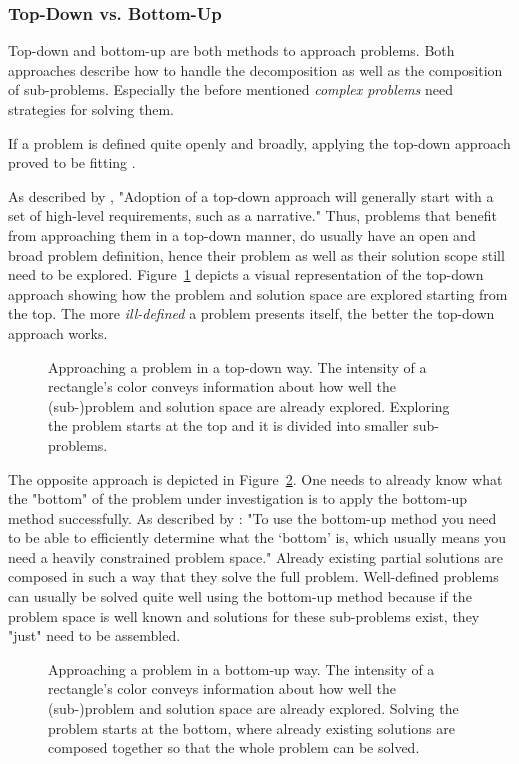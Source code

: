 \subsubsection{Top-Down vs. Bottom-Up}
Top-down and bottom-up are both methods to approach problems.
Both approaches describe how to handle the decomposition as well as the composition of sub-problems.
Especially the before mentioned \emph{complex problems} need strategies for solving them.

If a problem is defined quite openly and broadly, applying the top-down approach proved to be fitting \cite{kung_comparing_2013}.

As described by \citeauthor{kung_comparing_2013} \cite{kung_comparing_2013}, "Adoption of a top-down approach will generally start with a set of high-level requirements, such as a narrative."
Thus, problems that benefit from approaching them in a top-down manner, do usually have an open and broad problem definition, hence their problem as well as their solution scope still need to be explored.
Figure~\ref{fig:top-down} depicts a visual representation of the top-down approach showing how the problem and solution space are explored starting from the top.
The more \emph{ill-defined} a problem presents itself, the better the top-down approach works.
%
\begin{figure}[h]
\centering
\hspace*{0.15\linewidth}

\caption{Approaching a problem in a top-down way. The intensity of a rectangle's color conveys information about how well the (sub-)problem and solution space are already explored. Exploring the problem starts at the top and it is divided into smaller sub-problems.}
\label{fig:top-down}
\end{figure}
%
The opposite approach is depicted in Figure~\ref{fig:bottom-up}.
One needs to already know what the "bottom" of the problem under investigation is to apply the bottom-up method successfully.
As described by \citeauthor{jones_is_2011} \cite{jones_is_2011}: "To use the bottom-up method you need to be able to efficiently determine what the `bottom' is, which usually means you need a heavily constrained problem space."
Already existing partial solutions are composed in such a way that they solve the full problem.
Well-defined problems can usually be solved quite well using the bottom-up method because if the problem space is well known and solutions for these sub-problems exist, they "just" need to be assembled.
%
\begin{figure}
\centering
\hspace*{0.15\linewidth}

\caption{Approaching a problem in a bottom-up way. The intensity of a rectangle's color conveys information about how well the (sub-)problem and solution space are already explored. Solving the problem starts at the bottom, where already existing solutions are composed together so that the whole problem can be solved.}
\label{fig:bottom-up}
\end{figure}
